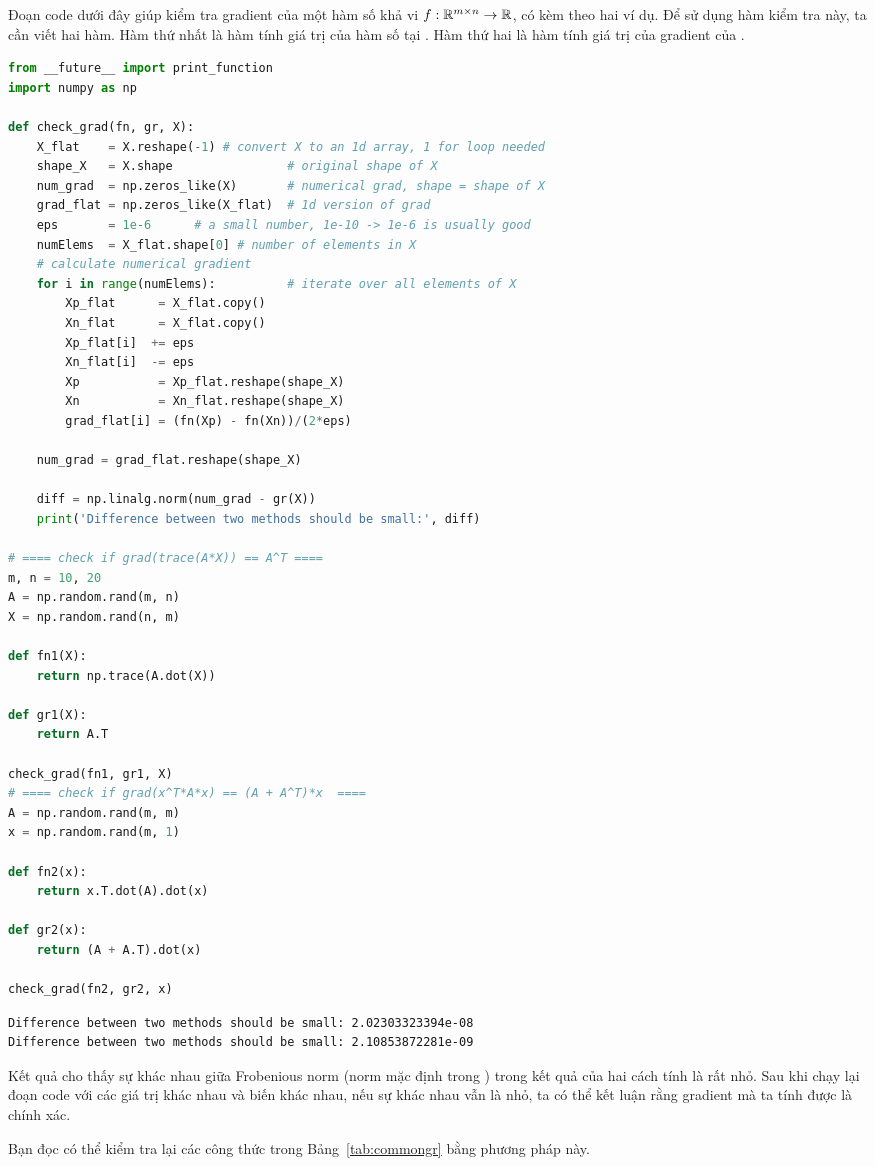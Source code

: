 Đoạn code dưới đây giúp kiểm tra gradient của một hàm số khả vi $f:
\mathbb{R}^{m \times n} \rightarrow \mathbb{R}$, có kèm theo hai ví dụ. Để sử dụng hàm kiểm tra
 này, ta cần viết hai hàm. Hàm thứ nhất là hàm
 tính giá trị của hàm số tại . Hàm thứ hai
là hàm  tính giá trị của gradient của .

\newpage

\begin{lstlisting}[language=Python]
from __future__ import print_function
import numpy as np

def check_grad(fn, gr, X):
    X_flat    = X.reshape(-1) # convert X to an 1d array, 1 for loop needed
    shape_X   = X.shape                # original shape of X
    num_grad  = np.zeros_like(X)       # numerical grad, shape = shape of X
    grad_flat = np.zeros_like(X_flat)  # 1d version of grad
    eps       = 1e-6      # a small number, 1e-10 -> 1e-6 is usually good
    numElems  = X_flat.shape[0] # number of elements in X
    # calculate numerical gradient
    for i in range(numElems):          # iterate over all elements of X
        Xp_flat      = X_flat.copy()
        Xn_flat      = X_flat.copy()
        Xp_flat[i]  += eps
        Xn_flat[i]  -= eps
        Xp           = Xp_flat.reshape(shape_X)
        Xn           = Xn_flat.reshape(shape_X)
        grad_flat[i] = (fn(Xp) - fn(Xn))/(2*eps)

    num_grad = grad_flat.reshape(shape_X)

    diff = np.linalg.norm(num_grad - gr(X))
    print('Difference between two methods should be small:', diff)

# ==== check if grad(trace(A*X)) == A^T ====
m, n = 10, 20
A = np.random.rand(m, n)
X = np.random.rand(n, m)

def fn1(X):
    return np.trace(A.dot(X))

def gr1(X):
    return A.T

check_grad(fn1, gr1, X)
# ==== check if grad(x^T*A*x) == (A + A^T)*x  ====
A = np.random.rand(m, m)
x = np.random.rand(m, 1)

def fn2(x):
    return x.T.dot(A).dot(x)

def gr2(x):
    return (A + A.T).dot(x)

check_grad(fn2, gr2, x)

\end{lstlisting}
\kq
\begin{lstlisting}
Difference between two methods should be small: 2.02303323394e-08
Difference between two methods should be small: 2.10853872281e-09
\end{lstlisting}

Kết quả cho thấy sự khác nhau giữa Frobenious norm (norm mặc định trong
) trong kết quả của hai cách tính là rất nhỏ. Sau
khi chạy lại đoạn code với các giá trị  khác nhau và biến
 khác nhau, nếu sự khác nhau vẫn là nhỏ, ta có thể kết luận rằng
gradient mà ta tính được là chính xác.

Bạn đọc có thể kiểm tra lại các công thức trong Bảng~\ref{tab:commongr} bằng
phương pháp này.




